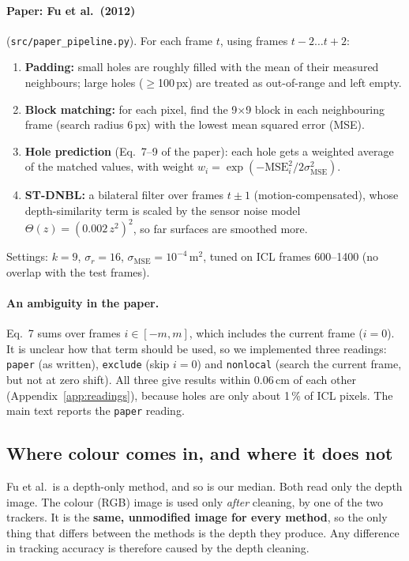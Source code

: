 \documentclass[11pt,a4paper]{article}
\newcommand{\cm}{\,cm\xspace}
\begin{document}
\paragraph{Paper: Fu et al.\ (2012)} (\texttt{src/paper\_pipeline.py}).
For each frame $t$, using frames $t-2 \dots t+2$:
\begin{enumerate}
  \item \textbf{Padding:} small holes are roughly filled with the mean of their measured neighbours;
        large holes ($\geq$100\,px) are treated as out-of-range and left empty.
  \item \textbf{Block matching:} for each pixel, find the 9$\times$9 block in each neighbouring frame (search radius
        6\,px) with the lowest mean squared error (MSE).
  \item \textbf{Hole prediction} (Eq.\ 7--9 of the paper): each hole gets a weighted average of the matched
        values, with weight $w_i = \exp(-\mathrm{MSE}_i^2 / 2\sigma_{\mathrm{MSE}}^2)$.
  \item \textbf{ST-DNBL:} a bilateral filter over frames $t\pm1$ (motion-compensated), whose depth-similarity
        term is scaled by the sensor noise model $\Theta(z) = (0.002\,z^2)^2$, so far surfaces are smoothed more.
\end{enumerate}
Settings: $k = 9$, $\sigma_r = 16$, $\sigma_{\mathrm{MSE}} = 10^{-4}\,\mathrm{m}^2$, tuned on ICL frames 600--1400
(no overlap with the test frames).

\paragraph{An ambiguity in the paper.}
Eq.\ 7 sums over frames $i \in [-m, m]$, which includes the current frame ($i = 0$). It is unclear how that term should
be used, so we implemented three readings: \texttt{paper} (as written), \texttt{exclude} (skip $i = 0$) and
\texttt{nonlocal} (search the current frame, but not at zero shift). All three give results within 0.06\cm of each
other (Appendix~\ref{app:readings}), because holes are only about 1\,\% of ICL pixels. The main text reports the
\texttt{paper} reading.

\subsection{Where colour comes in, and where it does not}
\label{sec:rgb}

\begin{keybox}[title=Neither cleaner uses the colour image]
Fu et al.\ is a depth-only method, and so is our median. Both read only the depth image.
The colour (RGB) image is used only \emph{after} cleaning, by one of the two trackers. It is the
\textbf{same, unmodified image for every method}, so the only thing that differs between the methods is the depth
they produce. Any difference in tracking accuracy is therefore caused by the depth cleaning.
\end{keybox}
\end{document}
